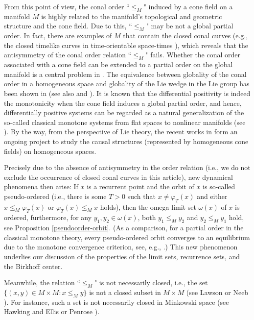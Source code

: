 \documentclass[a4paper,11pt]{article}
\theoremstyle{plain}
\theoremstyle{definition}
\numberwithin{equation}{section}
\begin{document}
From this point of view, the conal order ``$\leq_M$" induced by a cone field on a manifold $M$ is highly related to the manifold's topological and geometric structure and the cone field. Due to this, ``$\leq_M$" may be not a global partial order. In fact, there are examples of $M$ that contain the closed conal curves (e.g., the closed timelike curves in time-orientable space-times \cite[Chapter 5]{Hawkingandellis73}), which reveals that the antisymmetry of the conal order relation ``$\leq_M$" fails.
Whether the conal order associated with a cone field can be extended to a partial order on the global manifold is a central problem in \cite{Lawson89}. The equivalence between globality of the conal order in a homogeneous space and globality of the Lie wedge in the Lie group has been shown in \cite[Section 5]{Lawson89} (see also \cite[Theorem 1.6]{Neeb91} and \cite[Section 4.3]{HilgertNeeb93}). It is known that the differential positivity is indeed the monotonicity when the cone field induces a global partial order, and hence, differentially positive systems can be regarded as a natural generalization of the so-called classical monotone systems from flat spaces to nonlinear manifolds (see \cite[Appendix A.3]{NW25}). By the way, from the perspective of Lie theory, the recent works in \cite{Neebolafsson21,Neebolafsson21b,Neebolafsson23,Morinellineeb21,Neeborstedolafsson21}
form an ongoing project to study the causal structures (represented by homogeneous cone fields) on homogeneous spaces.	



Precisely due to the absence of antisymmetry in the order relation (i.e., we do not exclude the occurrence of closed conal curves in this article), new dynamical phenomena then arise: If $x$ is a recurrent point and the orbit of $x$ is so-called pseudo-ordered (i.e., there is some $T>0$ such that $x\neq \varphi_T(x)$ and either $x\leq_M \varphi_T(x)$ or $\varphi_T(x)\leq_M x$ holds), then the omega limit set $\omega(x)$ of $x$ is ordered, furthermore, for any $y_1, y_2 \in \omega(x)$, both $y_1\leq_M y_2$ and $y_2\leq_M y_1$ hold, see Proposition \ref{pseudoorder-orbit}. 
(As a comparison, for a partial order in the classical monotone theory, every pseudo-ordered orbit converges to an equilibrium due to the monotone convergence criterion, see, e.g., \cite[Theorem 1.2.1]{H95}.)
This new phenomenon underlies our discussion of the properties of the limit sets, recurrence sets, and the Birkhoff center.

Meanwhile, the relation ``$\leq_M$" is not necessarily closed, i.e., the set $\{(x,y)\in M\times M: x\leq_M y \}$ is not a closed subset in $M\times M$ (see Lawson \cite[p.299]{Lawson89} or Neeb \cite[p.470]{Neeb91}). For instance, such a set is not necessarily closed in Minkowski space (see Hawking and Ellis\cite[p.183]{Hawkingandellis73} or Penrose \cite[p.12]{Penrose72}).
\end{document}
